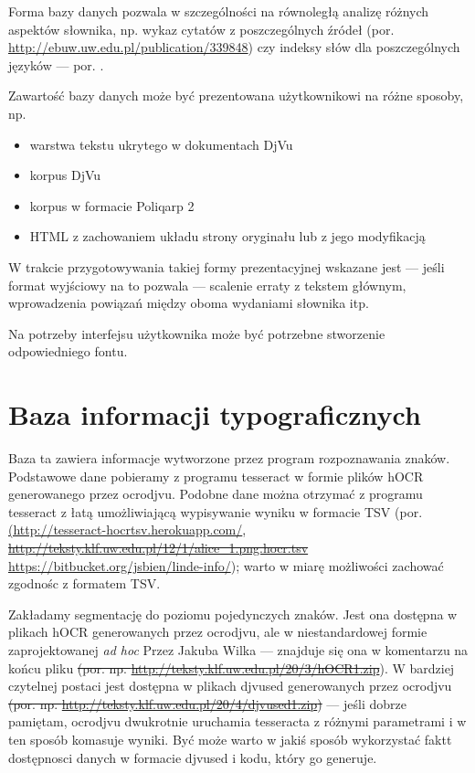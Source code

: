 \documentclass[12]{mwart}
\def\p#1{\textsf{#1}}
\begin{document}
Forma bazy danych pozwala w szczególności na równoległą analizę
różnych aspektów słownika, np. wykaz cytatów z poszczególnych źródeł
(por. \url{http://ebuw.uw.edu.pl/publication/339848}) czy indeksy słów dla
poszczególnych języków ---
por. \citep[s.~57]{ptaszyk07:_słown_samuel_bogum_lindeg}.

Zawartość bazy danych może być prezentowana użytkownikowi na różne
sposoby, np.
\begin{itemize}
\item warstwa tekstu ukrytego w dokumentach DjVu
\item korpus DjVu
\item korpus w formacie Poliqarp 2
\item HTML z zachowaniem układu strony oryginału lub z jego modyfikacją
\end{itemize}
W trakcie przygotowywania takiej formy prezentacyjnej wskazane jest
--- jeśli format wyjściowy na to pozwala --- scalenie erraty z tekstem
głównym,  wprowadzenia powiązań między oboma wydaniami słownika itp.

Na potrzeby interfejsu użytkownika może być potrzebne stworzenie
odpowiedniego fontu.

\section{Baza informacji typograficznych}
\label{sec:baza-inform-typogr-1}



Baza ta zawiera informacje wytworzone przez program rozpoznawania
znaków.  Podstawowe dane pobieramy z programu \p{tesseract} w formie
plików hOCR generowanego przez \p{ocrodjvu}. Podobne dane można
otrzymać z programu \p{tesseract} z łatą umożliwiającą wypisywanie
wyniku w formacie TSV
(por. \url{(http://tesseract-hocrtsv.herokuapp.com/},
\sout{\url{http://teksty.klf.uw.edu.pl/12/1/alice_1.png.hocr.tsv}}
\url{https://bitbucket.org/jsbien/linde-info/}); warto w miarę
możliwości zachować zgodnośc z formatem TSV.

Zakładamy segmentację do poziomu pojedynczych znaków. Jest ona
dostępna w plikach hOCR generowanych przez \p{ocrodjvu}, ale w
niestandardowej formie zaprojektowanej \textit{ad hoc} Przez Jakuba
Wilka --- znajduje się ona w komentarzu na końcu pliku
\sout{(por. np. \url{http://teksty.klf.uw.edu.pl/20/3/hOCR1.zip}}). W
bardziej czytelnej postaci jest dostępna w plikach djvused
generowanych przez \p{ocrodjvu}
\sout{(por. np. \url{http://teksty.klf.uw.edu.pl/20/4/djvused1.zip})} ---
jeśli dobrze pamiętam, \p{ocrodjvu} dwukrotnie uruchamia
\p{tesseracta} z różnymi parametrami i w ten sposób komasuje
wyniki. Być może warto w jakiś sposób wykorzystać faktt dostępnosci
danych w formacie djvused i kodu, który go generuje.
\end{document}
